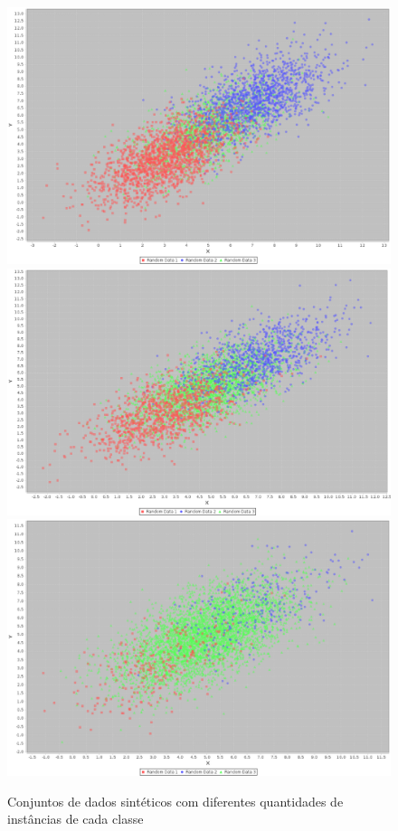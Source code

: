 \begin{figure}
  \centering
  \includegraphics[width=120mm,scale=0.7]{images/dist1500-1500-5.eps}
  \includegraphics[width=120mm,scale=0.7]{images/dist1000-2500-5.eps}
  \includegraphics[width=120mm,scale=0.7]{images/dist250-4000-5.eps}
  \caption{Conjuntos de dados sintéticos com diferentes quantidades de instâncias de cada classe}
  \label{fig:dist_diferentes}
\end{figure}

